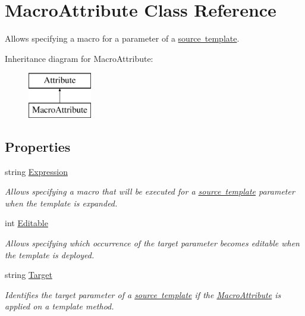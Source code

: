\hypertarget{class_macro_attribute}{}\section{Macro\+Attribute Class Reference}
\label{class_macro_attribute}


Allows specifying a macro for a parameter of a \mbox{\hyperlink{class_source_template_attribute}{source template}}.  


Inheritance diagram for Macro\+Attribute\+:\begin{figure}[H]
\begin{center}
\leavevmode
\includegraphics[height=2.000000cm]{class_macro_attribute}
\end{center}
\end{figure}
\subsection*{Properties}
\begin{DoxyCompactItemize}
\item 
string \mbox{\hyperlink{class_macro_attribute_a172bf7385bb748baa1eb2fa931f1f9f8}{Expression}}
\begin{DoxyCompactList}\small\item\em Allows specifying a macro that will be executed for a \mbox{\hyperlink{class_source_template_attribute}{source template}} parameter when the template is expanded. \end{DoxyCompactList}\item 
int \mbox{\hyperlink{class_macro_attribute_a273bac2efafc085eba59752b2ea3ae58}{Editable}}
\begin{DoxyCompactList}\small\item\em Allows specifying which occurrence of the target parameter becomes editable when the template is deployed. \end{DoxyCompactList}\item 
string \mbox{\hyperlink{class_macro_attribute_a94502148414b928f01ad540a924846d0}{Target}}
\begin{DoxyCompactList}\small\item\em Identifies the target parameter of a \mbox{\hyperlink{class_source_template_attribute}{source template}} if the \mbox{\hyperlink{class_macro_attribute}{Macro\+Attribute}} is applied on a template method. \end{DoxyCompactList}\end{DoxyCompactItemize}


